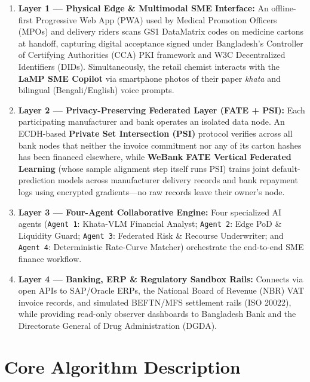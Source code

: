 \documentclass[10pt,a4paper]{article}
\begin{document}
\begin{enumerate}[noitemsep,topsep=2pt]
    \item \textbf{Layer 1 --- Physical Edge \& Multimodal SME Interface:} An offline-first Progressive Web App (PWA) used by Medical Promotion Officers (MPOs) and delivery riders scans GS1 DataMatrix codes on medicine cartons at handoff, capturing digital acceptance signed under Bangladesh's Controller of Certifying Authorities (CCA) PKI framework and W3C Decentralized Identifiers (DIDs). Simultaneously, the retail chemist interacts with the \textbf{LaMP SME Copilot} via smartphone photos of their paper \textit{khata} and bilingual (Bengali/English) voice prompts.
    \item \textbf{Layer 2 --- Privacy-Preserving Federated Layer (FATE + PSI):} Each participating manufacturer and bank operates an isolated data node. An ECDH-based \textbf{Private Set Intersection (PSI)} protocol verifies across all bank nodes that neither the invoice commitment nor any of its carton hashes has been financed elsewhere, while \textbf{WeBank FATE Vertical Federated Learning} (whose sample alignment step itself runs PSI) trains joint default-prediction models across manufacturer delivery records and bank repayment logs using encrypted gradients---no raw records leave their owner's node.
    \item \textbf{Layer 3 --- Four-Agent Collaborative Engine:} Four specialized AI agents (\texttt{Agent 1}: Khata-VLM Financial Analyst; \texttt{Agent 2}: Edge PoD \& Liquidity Guard; \texttt{Agent 3}: Federated Risk \& Recourse Underwriter; and \texttt{Agent 4}: Deterministic Rate-Curve Matcher) orchestrate the end-to-end SME finance workflow.
    \item \textbf{Layer 4 --- Banking, ERP \& Regulatory Sandbox Rails:} Connects via open APIs to SAP/Oracle ERPs, the National Board of Revenue (NBR) VAT invoice records, and simulated BEFTN/MFS settlement rails (ISO 20022), while providing read-only observer dashboards to Bangladesh Bank and the Directorate General of Drug Administration (DGDA).
\end{enumerate}

\section{Core Algorithm Description}
\end{document}
